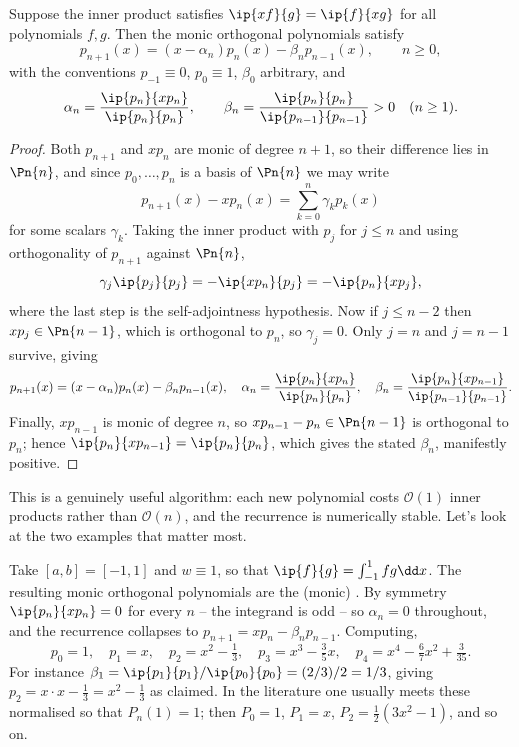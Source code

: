 \begin{theorem}\label{thm:threeterm}
  Suppose the inner product satisfies $\ip{xf}{g} = \ip{f}{xg}$ for all polynomials $f, g$. Then the monic orthogonal polynomials satisfy
  $$
  p_{n+1}(x) = (x - \alpha_n)p_n(x) - \beta_n p_{n-1}(x), \qquad n \geq 0,
  $$
  with the conventions $p_{-1} \equiv 0$, $p_0 \equiv 1$, $\beta_0$ arbitrary, and
  $$
  \alpha_n = \frac{\ip{p_n}{xp_n}}{\ip{p_n}{p_n}}, \qquad \beta_n = \frac{\ip{p_n}{p_n}}{\ip{p_{n-1}}{p_{n-1}}} > 0 \quad (n \geq 1).
  $$
\end{theorem}
\begin{proof}
  Both $p_{n+1}$ and $xp_n$ are monic of degree $n+1$, so their difference lies in $\Pn{n}$, and since $p_0, \dots, p_n$ is a basis of $\Pn{n}$ we may write
  $$
  p_{n+1}(x) - xp_n(x) = \sum_{k=0}^{n}\gamma_k p_k(x)
  $$
  for some scalars $\gamma_k$. Taking the inner product with $p_j$ for $j \le n$ and using orthogonality of $p_{n+1}$ against $\Pn{n}$,
  $$
  \gamma_j \ip{p_j}{p_j} = -\ip{xp_n}{p_j} = -\ip{p_n}{xp_j},
  $$
  where the last step is the self-adjointness hypothesis. Now if $j \leq n - 2$ then $xp_j \in \Pn{n-1}$, which is orthogonal to $p_n$, so $\gamma_j = 0$. Only $j = n$ and $j = n-1$ survive, giving
  $$
  p_{n+1}(x) = (x - \alpha_n)p_n(x) - \beta_n p_{n-1}(x), \quad \alpha_n = \frac{\ip{p_n}{xp_n}}{\ip{p_n}{p_n}}, \quad \beta_n = \frac{\ip{p_n}{xp_{n-1}}}{\ip{p_{n-1}}{p_{n-1}}}.
  $$
  Finally, $xp_{n-1}$ is monic of degree $n$, so $xp_{n-1} - p_n \in \Pn{n-1}$ is orthogonal to $p_n$; hence $\ip{p_n}{xp_{n-1}} = \ip{p_n}{p_n}$, which gives the stated $\beta_n$, manifestly positive.
\end{proof}

This is a genuinely useful algorithm: each new polynomial costs $\mathcal{O}(1)$ inner products rather than $\mathcal{O}(n)$, and the recurrence is numerically stable. Let's look at the two examples that matter most.

\begin{example}
  Take $[a,b] = [-1,1]$ and $w \equiv 1$, so that $\ip{f}{g} = \int_{-1}^1 fg \dd x$. The resulting monic orthogonal polynomials are the (monic) . By symmetry $\ip{p_n}{xp_n} = 0$ for every $n$ -- the integrand is odd -- so $\alpha_n = 0$ throughout, and the recurrence collapses to $p_{n+1} = xp_n - \beta_n p_{n-1}$. Computing,
  $$
  p_0 = 1, \quad p_1 = x, \quad p_2 = x^2 - \tfrac{1}{3}, \quad p_3 = x^3 - \tfrac{3}{5}x, \quad p_4 = x^4 - \tfrac{6}{7}x^2 + \tfrac{3}{35}.
  $$
  For instance $\beta_1 = \ip{p_1}{p_1}/\ip{p_0}{p_0} = (2/3)/2 = 1/3$, giving $p_2 = x \cdot x - \tfrac13 = x^2 - \tfrac13$ as claimed. In the literature one usually meets these normalised so that $P_n(1) = 1$; then $P_0 = 1$, $P_1 = x$, $P_2 = \tfrac12(3x^2 - 1)$, and so on.
\end{example}

